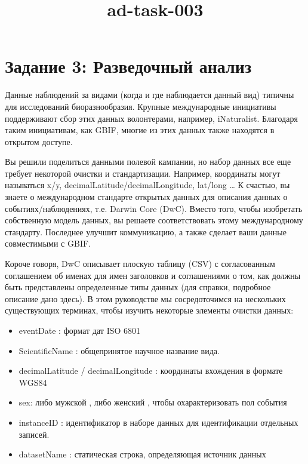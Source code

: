 \documentclass[11pt]{article}
\title{ad-task-003}
\providecommand{\tightlist}{%
      \setlength{\itemsep}{0pt}\setlength{\parskip}{0pt}}
\begin{document}
    
    \maketitle
    
    

    
    \section{Задание 3: Разведочный
анализ}\label{ux437ux430ux434ux430ux43dux438ux435-3-ux440ux430ux437ux432ux435ux434ux43eux447ux43dux44bux439-ux430ux43dux430ux43bux438ux437}

Данные наблюдений за видами (когда и где наблюдается данный вид) типичны
для исследований биоразнообразия. Крупные международные инициативы
поддерживают сбор этих данных волонтерами, например, iNaturalist.
Благодаря таким инициативам, как GBIF, многие из этих данных также
находятся в открытом доступе.

Вы решили поделиться данными полевой кампании, но набор данных все еще
требует некоторой очистки и стандартизации. Например, координаты могут
называться x/y, decimalLatitude/decimalLongitude, lat/long \ldots{} К
счастью, вы знаете о международном стандарте открытых данных для
описания данных о событиях/наблюдениях, т.е. Darwin Core (DwC). Вместо
того, чтобы изобретать собственную модель данных, вы решаете
соответствовать этому международному стандарту. Последнее улучшит
коммуникацию, а также сделает ваши данные совместимыми с GBIF.

Короче говоря, DwC описывает плоскую таблицу (CSV) с согласованным
соглашением об именах для имен заголовков и соглашениями о том, как
должны быть представлены определенные типы данных (для справки,
подробное описание дано здесь). В этом руководстве мы сосредоточимся на
нескольких существующих терминах, чтобы изучить некоторые элементы
очистки данных:

\begin{itemize}
\tightlist
\item
  eventDate : формат дат ISO 6801
\item
  ScientificName : общепринятое научное название вида.
\item
  decimalLatitude / decimalLongitude : координаты вхождения в формате
  WGS84
\item
  sex: либо мужской , либо женский , чтобы охарактеризовать пол события
\item
  instanceID : идентификатор в наборе данных для идентификации отдельных
  записей.
\item
  datasetName : статическая строка, определяющая источник данных
\end{itemize}
\end{document}
